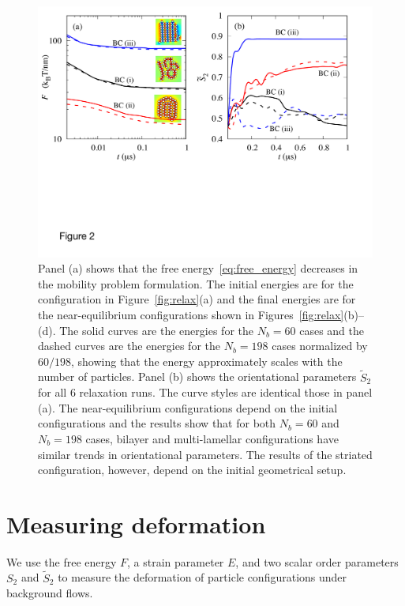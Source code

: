 \documentclass[prb,preprint,showpacs,preprintnumbers,amsmath,amssymb,longbibliography]{revtex4-1}
\begin{document}
\begin{figure}
  \begin{center}
\includegraphics[width=1.0\textwidth]{Figures/Figure2.pdf}
  \end{center}
  \vspace{-20pt}
  \caption{\label{fig:relax_energy}
  Panel (a) shows that the free energy~\eqref{eq:free_energy} decreases
  in the mobility problem formulation. The initial energies are for the
  configuration in Figure~\ref{fig:relax}(a) and the final energies are
  for the near-equilibrium configurations shown in
  Figures~\ref{fig:relax}(b)--(d). The solid curves are the energies for
  the $N_b=60$ cases and the dashed curves are the energies for the $N_b
  = 198$ cases normalized by $60/198$, showing that the energy
  approximately scales with the number of particles.  Panel (b) shows
  the orientational parameters $\tilde{S}_2$ for all 6 relaxation runs.
  The curve styles are identical those in panel (a). The
  near-equilibrium configurations depend on the initial configurations
  and the results show that for both $N_b=60$ and $N_b=198$ cases,
  bilayer and multi-lamellar configurations have similar trends in
  orientational parameters. The results of the striated configuration,
  however, depend on the initial geometrical setup.}
\end{figure}

\section{Measuring deformation}
We use the free energy $F$, a strain parameter $E$, and two scalar order
parameters $S_{2}$ and $\tilde S_2$ to measure the deformation of
particle configurations under background flows. 
\end{document}
